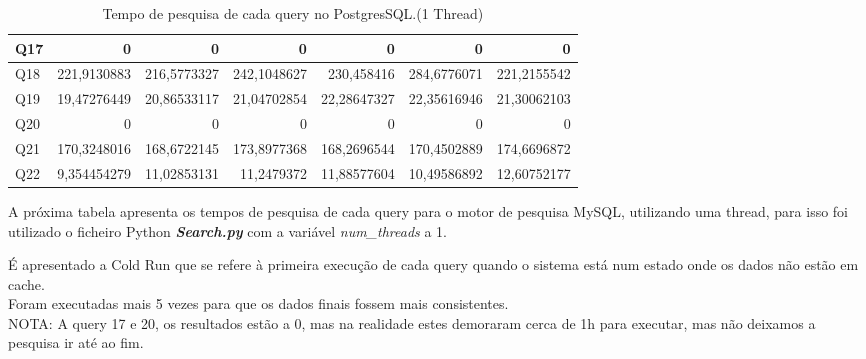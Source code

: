 \documentclass{article}
\begin{document}
\begin{table}[H]
{\begin{tabular}{|l|r|r|r|r|r|r|}
        Q17	&	0	&0&	0		&0 & 0 & 0\\ \hline
        Q18	&221,9130883	&216,5773327&	242,1048627&	230,458416	&284,6776071 &	221,2155542\\ \hline
        Q19	&19,47276449&	20,86533117	&21,04702854	&22,28647327&	22,35616946&	21,30062103\\ \hline
        Q20	&	0	&0&	0		&0 & 0 & 0\\ \hline
        Q21&	170,3248016&		168,6722145	&	173,8977368&		168,2696544	&	170,4502889	&	174,6696872\\ \hline
        Q22	&9,354454279&	11,02853131	&11,2479372&	11,88577604&	10,49586892	&12,60752177\\ \hline
      \end{tabular}}
      
    \caption{Tempo de pesquisa de cada query no PostgresSQL.(1 Thread)}
    \label{tab:BC_Table3}
  \end{table}
\clearpage

\texttt{}\par A próxima tabela apresenta os tempos de pesquisa de cada query para o motor de pesquisa MySQL, utilizando uma thread, para isso foi utilizado o ficheiro Python \textbf{\textit{Search.py}}  com a variável \textit{num\_threads} a 1. 
\texttt{}\par É apresentado a Cold Run que se refere à primeira execução de cada query quando o sistema está num estado onde os dados não estão em cache.\\
Foram executadas mais 5 vezes para que os dados finais fossem mais consistentes.\\
NOTA: A query 17 e 20, os resultados estão a 0, mas na realidade estes demoraram cerca de 1h para executar, mas não deixamos a pesquisa ir até ao fim.
\end{document}
